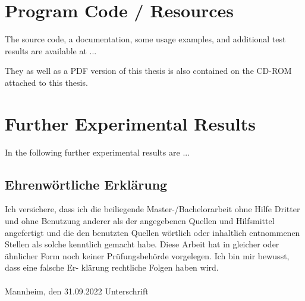 \documentclass[11pt,titlepage,oneside,openany]{book}
\begin{document}
\chapter{Program Code / Resources}
\label{cha:appendix-a}

The source code, a documentation, some usage examples, and additional test results are available at ...

They as well as a PDF version of this thesis is also contained on the CD-ROM attached to this thesis.

\chapter{Further Experimental Results}
\label{cha:appendix-b}

In the following further experimental results are ...


\newpage


\pagestyle{empty}


\section*{Ehrenw\"ortliche Erkl\"arung}
Ich versichere, dass ich die beiliegende Master-/Bachelorarbeit ohne Hilfe Dritter
und ohne Benutzung anderer als der angegebenen Quellen und Hilfsmittel
angefertigt und die den benutzten Quellen w\"ortlich oder inhaltlich
entnommenen Stellen als solche kenntlich gemacht habe. Diese Arbeit
hat in gleicher oder \"ahnlicher Form noch keiner Pr\"ufungsbeh\"orde
vorgelegen. Ich bin mir bewusst, dass eine falsche Er- kl\"arung rechtliche Folgen haben
wird.
\\
\\

\noindent
Mannheim, den 31.09.2022 \hspace{4cm} Unterschrift
\end{document}

